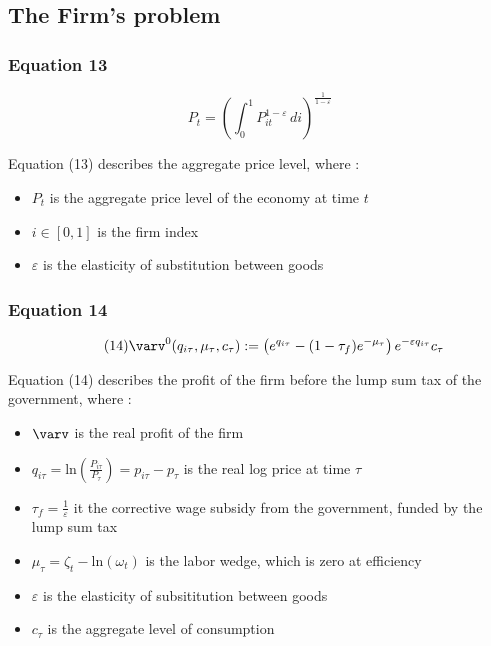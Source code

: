 \documentclass{article}
\begin{document}
\subsection{The Firm's problem}

\subsubsection*{Equation 13}
\begin{equation}\tag{13}
    P_{t}=\left(\int_{0}^{1}P_{it}^{1-\varepsilon}\,di\right)^{\frac{1}{1-\varepsilon}}
\end{equation}

Equation (13) describes the aggregate price level, where : 
\begin{itemize}
    \item $P_{t}$ is the aggregate price level of the economy at time $t$
    \item $i\in\left[0,1\right]$ is the firm index
    \item $\varepsilon$ is the elasticity of substitution between goods
\end{itemize}

\subsubsection*{Equation 14}
\begin{equation}\tag{14}
    \varv^{0}(q_{i\tau},\mu_{\tau},c_{\tau}):=\left(e^{q_{i\tau}}-(1-\tau_{f})e^{-\mu_{\tau}}\right)e^{-\varepsilon q_{i\tau}}c_{\tau}
\end{equation}

Equation (14) describes the profit of the firm before the lump sum tax of the government, where : 
\begin{itemize}
    \item $\varv$ is the real profit of the firm
    \item $q_{i\tau}=\text{ln}\left(\frac{P_{i\tau}}{P_{\tau}}\right)=p_{i\tau}-p_{\tau}$ is the real log price at time $\tau$
    \item $\tau_f=\frac{1}{\varepsilon}$ it the corrective wage subsidy from the government, funded by the lump sum tax
    \item $\mu_{\tau}=\zeta_{t}-\text{ln}(\omega_{t})$ is the labor wedge, which is zero at efficiency
    \item $\varepsilon$ is the elasticity of subsititution between goods
    \item $c_{\tau}$ is the aggregate level of consumption
\end{itemize}
\end{document}
